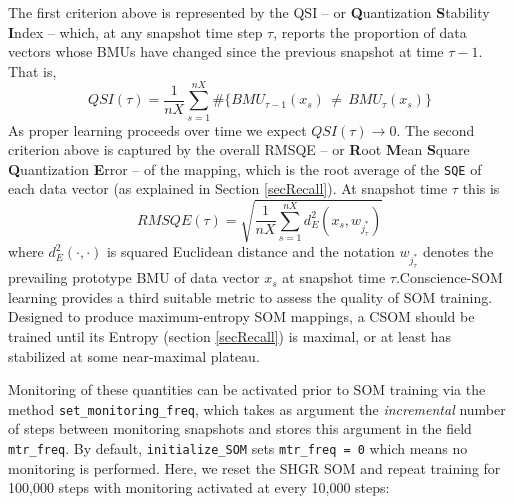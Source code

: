 \documentclass[]{article}
\begin{document}
The first criterion above is represented by the QSI -- or \textbf{Q}uantization \textbf{S}tability \textbf{I}ndex -- which, at any snapshot time step \(\tau\), reports the proportion of data vectors whose BMUs have changed since the previous snapshot at time \(\tau - 1\). That is,
\[ QSI(\tau) = \frac{1}{nX} \sum\limits_{s=1}^{nX} \#\{ BMU_{\tau-1}(x_s) \, \neq \, BMU_{\tau}(x_s) \}\]
As proper learning proceeds over time we expect \(QSI(\tau) \to 0\). The second criterion above is captured by the overall RMSQE -- or \textbf{R}oot \textbf{M}ean \textbf{S}quare \textbf{Q}uantization \textbf{E}rror -- of the mapping, which is the root average of the \texttt{SQE} of each data vector (as explained in Section \ref{secRecall}). At snapshot time \(\tau\) this is
\[ RMSQE(\tau) = \sqrt{ \frac{1}{nX} \sum\limits_{s=1}^{nX} d_E^2(x_s, w_{j^*_{\tau}}) } \]
where \(d_E^2(\cdot,\cdot)\) is squared Euclidean distance and the notation \(w_{j^*_{\tau}}\) denotes the prevailing prototype BMU of data vector \(x_s\) at snapshot time \(\tau\).Conscience-SOM learning provides a third suitable metric to assess the quality of SOM training. Designed to produce maximum-entropy SOM mappings, a CSOM should be trained until its Entropy (section \ref{secRecall}) is maximal, or at least has stabilized at some near-maximal plateau.

Monitoring of these quantities can be activated prior to SOM training via the method \texttt{set\_monitoring\_freq}, which takes as argument the \emph{incremental} number of steps between monitoring snapshots and stores this argument in the field \texttt{mtr\_freq}. By default, \texttt{initialize\_SOM} sets \texttt{mtr\_freq\ =\ 0} which means no monitoring is performed. Here, we reset the SHGR SOM and repeat training for 100,000 steps with monitoring activated at every 10,000 steps:
\end{document}

